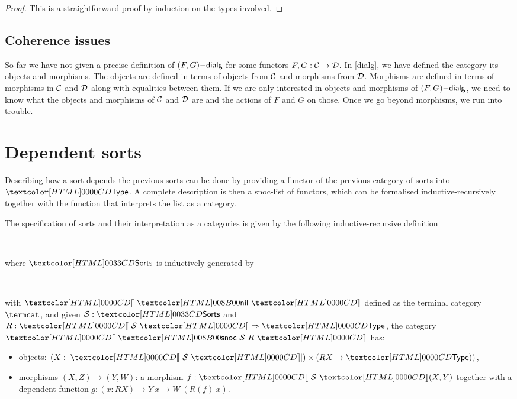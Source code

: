 \begin{proof}
  This is a straightforward proof by induction on the types involved.
\end{proof}

\subsection{Coherence issues}

So far we have not given a precise definition of $(F,G)\mathsf{-dialg}$ for
some functors $F, G : \mathcal{C} \to \mathcal{D}$. In \cref{dialg}, we have defined
the category its objects and morphisms. The objects are defined in
terms of objects from $\mathcal{C}$ and morphisms from $\mathcal{D}$. Morphisms are
defined in terms of morphisms in $\mathcal{C}$ and $\mathcal{D}$ along with equalities
between them. If we are only interested in objects and morphisms of
$(F,G)\mathsf{-dialg}$, we need to know what the objects and morphisms of
$\mathcal{C}$ and $\mathcal{D}$ are and the actions of $F$ and $G$ on those. Once we
go beyond morphisms, we run into trouble.



\section{Dependent sorts}

Describing how a sort depends the previous sorts can be done by
providing a functor of the previous category of sorts into $\Type$. A
complete description is then a snoc-list of functors, which can be
formalised inductive-recursively together with the function that
interprets the list as a category.
% 
\begin{definition}
  The specification of sorts and their interpretation as a
  categories is given by the following inductive-recursive
  definition
  \begin{sorts}
    \sortname{\sortsty}{\Type} \\
    \functy{\SortCat{\_}}{\sortsty \to \Cat}
  \end{sorts}
  where $\sortsty$ is inductively generated by
  \begin{datatype}{\sortsty}{}
    \constr{\sortsnil}{\sortsty} \\
    \constr{\sortssnoc}{(\Ss : \sortsty) \to (\Func{\SortCat{\Ss}}{\Type}) \to \sortsty}
  \end{datatype}
  with $\SortCat{\sortsnil}$ defined as the terminal category $\termcat$, and given
  $\Ss : \sortsty$ and $R : \Func{\SortCat{\Ss}}{\Type}$,
  the category $\SortCat{\sortssnoc\ \Ss\ R}$ has:
  \begin{itemize}
  \item objects: $(X : | \SortCat{\Ss} |) \times (R X \to \Type))$,
  \item morphisms $(X,Z) \to (Y,W)$: a morphism $f : \SortCat{\Ss}(X,Y)$
    together with a dependent function $g : (x : R X) \to Y\ x \to W\ (R(f)\ x)$.
  \end{itemize}
\end{definition}

